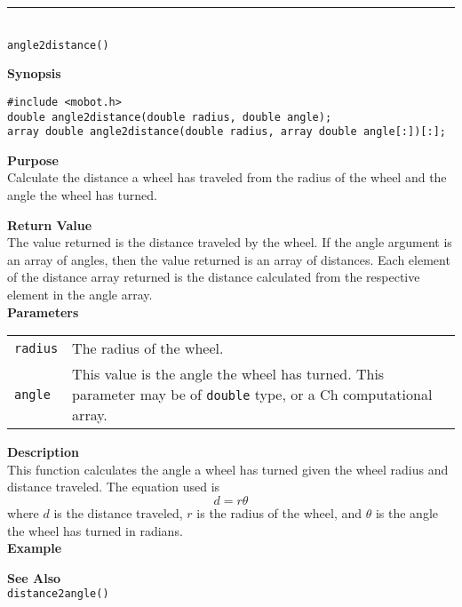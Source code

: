 \noindent
\vspace{5pt}
\rule{4.5in}{0.015in}\\
\noindent
{\LARGE \texttt{angle2distance()}}\\
{}

\noindent
{\bf Synopsis}
\vspace{-8pt}
\begin{verbatim}
#include <mobot.h>
double angle2distance(double radius, double angle);
array double angle2distance(double radius, array double angle[:])[:];
\end{verbatim}

\noindent
{\bf Purpose}\\
Calculate the distance a wheel has traveled from the radius of the wheel and
the angle the wheel has turned.

\noindent
{\bf Return Value}\\
The value returned is the distance traveled by the wheel. If the angle argument is an
array of angles, then the value returned is an array of distances. Each element
of the distance array returned is the distance calculated from the respective
element in the angle array.\\

\noindent
{\bf Parameters}
\vspace{-0.1in}
\begin{description}
\item               
\begin{tabular}{p{10 mm}p{145 mm}}
\texttt{radius} & The radius of the wheel. \\
\texttt{angle} & This value is the angle the wheel has turned. This parameter may be of \texttt{double} type, or a Ch computational array. \\
\end{tabular}
\end{description}

\noindent
{\bf Description}\\
This function calculates the angle a wheel has turned given the wheel 
radius and distance traveled. The equation used is
\begin{equation*}
d = r \theta
\end{equation*}
where $d$ is the distance traveled, $r$ is the radius of the wheel, and $\theta$ is
the angle the wheel has turned in radians.
\\

\noindent
{\bf Example}\\
\noindent

\noindent
{\bf See Also}\\
\texttt{distance2angle()}

